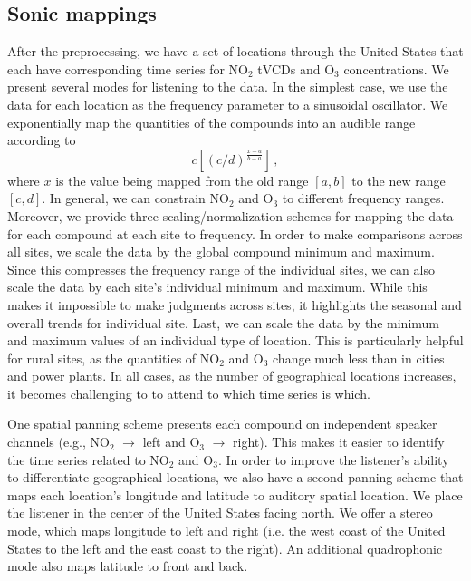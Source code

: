 \documentclass[a4paper,10pt,oneside]{article}
\newcommand{\ce}[1]{$\mathrm{#1}$}
\begin{document}
\begin{sloppy}
\subsection{Sonic mappings}
\label{sec:sonic-mappings}
After the preprocessing, we have a set of locations through the United States that each have corresponding time series for \ce{NO_2} tVCDs and \ce{O_3} concentrations. We present several modes for listening to the data. In the simplest case, we use the data for each location as the frequency parameter to a sinusoidal oscillator.  We exponentially map the quantities of the compounds into an audible range according to
\begin{equation}
    c \left[(c/d)^{\frac{x-a}{b-a}}\right]\,,
\end{equation}
where $x$ is the value being mapped from the old range $[a, b]$ to the new range $[c, d]$.  In general, we can constrain \ce{NO_2} and \ce{O_3} to different frequency ranges.  Moreover, we provide three scaling/normalization schemes for mapping the data for each compound at each site to frequency. In order to make comparisons across all sites, we scale the data by the global compound minimum and maximum.  Since this compresses the frequency range of the individual sites, we can also scale the data by each site's individual minimum and maximum. While this makes it impossible to make judgments across sites, it highlights the seasonal and overall trends for individual site. Last, we can scale the data by the minimum and maximum values of an individual type of location. This is particularly helpful for rural sites, as the quantities of \ce{NO_2} and \ce{O_3} change much less than in cities and power plants. In all cases, as the number of geographical locations increases, it becomes challenging to to attend to which time series is which.  

One spatial panning scheme presents each compound on independent speaker channels (e.g., \ce{NO_2} $\rightarrow$ left and \ce{O_3} $\rightarrow$ right).  This  makes it easier to identify the time series related to \ce{NO_2} and \ce{O_3}.  In order to improve the listener's ability to differentiate geographical locations, we also have a second panning scheme that maps each location's longitude and latitude to auditory spatial location. We place the listener in the center of the United States facing north.  We offer a stereo mode, which maps longitude to left and right (i.e. the west coast of the United States to the left and the east coast to the right). An additional quadrophonic mode also maps latitude to front and back. 


\end{sloppy}
\end{document}

